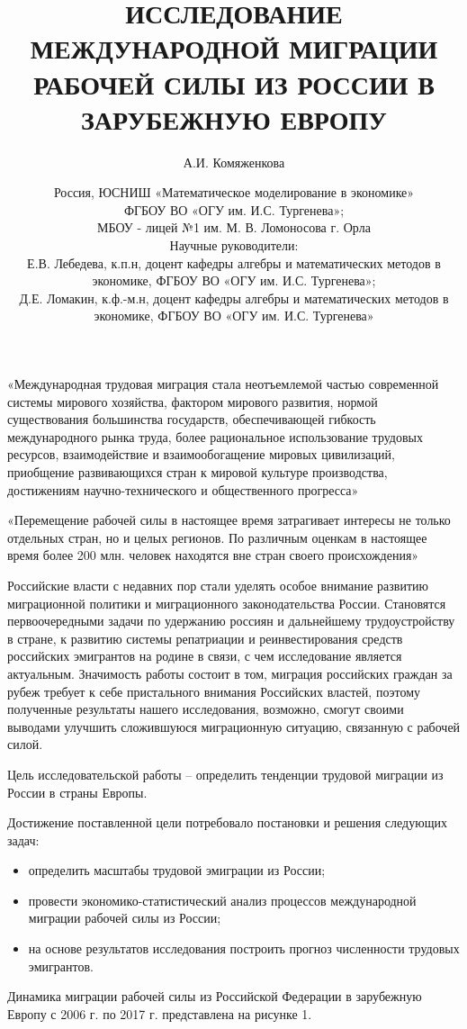 \documentclass[a4paper,12pt]{article}
\title{ИССЛЕДОВАНИЕ МЕЖДУНАРОДНОЙ МИГРАЦИИ РАБОЧЕЙ СИЛЫ ИЗ РОССИИ В ЗАРУБЕЖНУЮ ЕВРОПУ}
\author{А.И. Комяженкова}
\date{Россия, ЮСНИШ «Математическое моделирование в экономике» \\
ФГБОУ ВО «ОГУ им. И.С. Тургенева»; \\
МБОУ - лицей №1 им. М. В. Ломоносова г. Орла \\
Научные руководители: \\
Е.В. Лебедева, к.п.н, доцент кафедры алгебры и математических методов в экономике, ФГБОУ ВО «ОГУ им. И.С. Тургенева»; \\
Д.Е. Ломакин, к.ф.-м.н, доцент кафедры алгебры и математических методов в экономике, ФГБОУ ВО «ОГУ им. И.С. Тургенева»}
\begin{document}
\maketitle
\section*{}
«Международная трудовая миграция стала неотъемлемой частью современной системы мирового хозяйства, фактором мирового развития, нормой существования большинства государств, обеспечивающей гибкость международного рынка труда, более рациональное использование трудовых ресурсов, взаимодействие и взаимообогащение мировых цивилизаций, приобщение развивающихся стран к мировой культуре производства, достижениям научно-технического и общественного прогресса» 

«Перемещение рабочей силы в настоящее время затрагивает интересы не только отдельных стран, но и целых регионов. По различным оценкам в настоящее время более 200 млн. человек находятся вне стран своего происхождения» 

Российские власти с недавних пор стали уделять особое внимание развитию миграционной политики и миграционного законодательства России. Становятся первоочередными задачи по удержанию россиян и дальнейшему трудоустройству в стране, к развитию системы репатриации и реинвестирования средств российских эмигрантов на родине в связи, с чем исследование является актуальным. Значимость работы состоит в том, миграция российских граждан за рубеж требует к себе пристального внимания Российских властей, поэтому полученные результаты нашего исследования, возможно, смогут своими выводами улучшить сложившуюся миграционную ситуацию, связанную с рабочей силой.

Цель исследовательской работы – определить тенденции трудовой миграции из России в страны Европы.

Достижение поставленной цели потребовало постановки и решения следующих задач:
\begin{itemize}
    \item определить масштабы трудовой эмиграции из России;
    \item провести экономико-статистический анализ процессов международной миграции рабочей силы из России;
    \item на основе результатов исследования построить прогноз численности трудовых эмигрантов.
\end{itemize}
Динамика миграции рабочей силы из Российской Федерации в зарубежную Европу с 2006 г. по 2017 г. представлена на рисунке 1.
\end{document}
